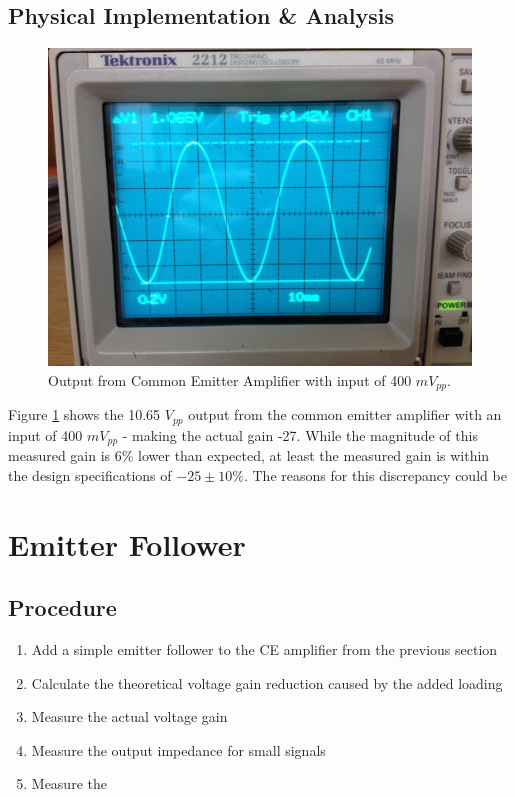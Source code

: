 \documentclass[12pt,letterpaper]{report}
\newlength \figwidth
\begin{document}
\subsection*{Physical Implementation \& Analysis}
\begin{figure}[H]
\centering
\includegraphics[width=\figwidth, keepaspectratio=true]{lab6_images/simple_output.jpg}
\caption{Output from Common Emitter Amplifier with input of 400  $mV_{pp}$.}
\label{fig:simple_output}
\end{figure}
Figure \ref{fig:simple_output} shows the 10.65 $V_{pp}$ output from the common emitter amplifier with an input of 400 $mV_{pp}$ - making the actual gain -27. While the magnitude of this measured gain is 6\% lower than expected, at least the measured gain is within the design specifications of $-25 \pm 10\%$. The reasons for this discrepancy could be 

\section*{Emitter Follower}
\subsection*{Procedure}

\begin{enumerate}
\item Add a simple emitter follower to the CE amplifier from the previous section
\item Calculate the theoretical voltage gain reduction caused by the added loading
\item Measure the actual voltage gain
\item Measure the output impedance for small signals
\item Measure the 
\end{enumerate}
\end{document}
